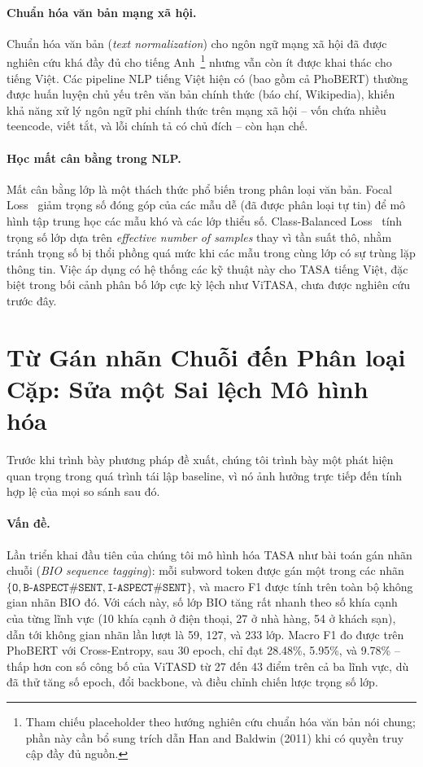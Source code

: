 \documentclass[11pt]{article}
\begin{document}
\paragraph{Chuẩn hóa văn bản mạng xã hội.} Chuẩn hóa văn bản (\textit{text normalization}) cho ngôn ngữ mạng xã hội đã được nghiên cứu khá đầy đủ cho tiếng Anh~\citep{lin2017focal}\footnote{Tham chiếu placeholder theo hướng nghiên cứu chuẩn hóa văn bản nói chung; phần này cần bổ sung trích dẫn Han and Baldwin (2011) khi có quyền truy cập đầy đủ nguồn.} nhưng vẫn còn ít được khai thác cho tiếng Việt. Các pipeline NLP tiếng Việt hiện có (bao gồm cả PhoBERT) thường được huấn luyện chủ yếu trên văn bản chính thức (báo chí, Wikipedia), khiến khả năng xử lý ngôn ngữ phi chính thức trên mạng xã hội -- vốn chứa nhiều teencode, viết tắt, và lỗi chính tả có chủ đích -- còn hạn chế.

\paragraph{Học mất cân bằng trong NLP.} Mất cân bằng lớp là một thách thức phổ biến trong phân loại văn bản. Focal Loss~\citep{lin2017focal} giảm trọng số đóng góp của các mẫu dễ (đã được phân loại tự tin) để mô hình tập trung học các mẫu khó và các lớp thiểu số. Class-Balanced Loss~\citep{cui2019classbalanced} tính trọng số lớp dựa trên \textit{effective number of samples} thay vì tần suất thô, nhằm tránh trọng số bị thổi phồng quá mức khi các mẫu trong cùng lớp có sự trùng lặp thông tin. Việc áp dụng có hệ thống các kỹ thuật này cho TASA tiếng Việt, đặc biệt trong bối cảnh phân bố lớp cực kỳ lệch như ViTASA, chưa được nghiên cứu trước đây.


\section{Từ Gán nhãn Chuỗi đến Phân loại Cặp: Sửa một Sai lệch Mô hình hóa}
\label{sec:reformulation}

Trước khi trình bày phương pháp đề xuất, chúng tôi trình bày một phát hiện quan trọng trong quá trình tái lập baseline, vì nó ảnh hưởng trực tiếp đến tính hợp lệ của mọi so sánh sau đó.

\paragraph{Vấn đề.} Lần triển khai đầu tiên của chúng tôi mô hình hóa TASA như bài toán gán nhãn chuỗi (\textit{BIO sequence tagging}): mỗi subword token được gán một trong các nhãn $\{\texttt{O}, \texttt{B-ASPECT\#SENT}, \texttt{I-ASPECT\#SENT}\}$, và macro F1 được tính trên toàn bộ không gian nhãn BIO đó. Với cách này, số lớp BIO tăng rất nhanh theo số khía cạnh của từng lĩnh vực (10 khía cạnh ở điện thoại, 27 ở nhà hàng, 54 ở khách sạn), dẫn tới không gian nhãn lần lượt là 59, 127, và 233 lớp. Macro F1 đo được trên PhoBERT với Cross-Entropy, sau 30 epoch, chỉ đạt 28.48\%, 5.95\%, và 9.78\% -- thấp hơn con số công bố của ViTASD từ 27 đến 43 điểm trên cả ba lĩnh vực, dù đã thử tăng số epoch, đổi backbone, và điều chỉnh chiến lược trọng số lớp.
\end{document}
